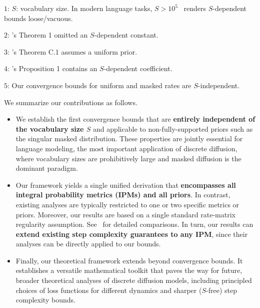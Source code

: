 \documentclass{article} %
\begin{document}
\begin{table}[ht]
\begin{tablenotes}
        \footnotesize
        \item[1] $1$: $S$: vocabulary size. In modern language tasks, $S > 10^5$~\citep{nie2026large} renders $S$-dependent bounds loose/vacuous.
        \item[2] $2$: \cite{liang2026absorb}'s Theorem 1 omitted an $S$-dependent constant.
        \item[3] $3$: \cite{ren2025discrete}'s Theorem C.1 assumes a uniform prior.
        \item[4] $4$: \cite{liang2026sharp}'s Proposition 1 contains an $S$-dependent coefficient.
        \item[5] $5$: Our convergence bounds for uniform and masked rates are $S$-independent.
    \end{tablenotes}
\end{table}

We summarize our contributions as follows.
\begin{itemize}
    \item We establish the first convergence bounds that are \textbf{entirely independent of the vocabulary size $S$} and applicable to non-fully-supported priors such as the singular masked distribution. These properties are jointly essential for language modeling, the most important application of discrete diffusion, where vocabulary sizes are prohibitively large and masked diffusion is the dominant paradigm.
    \item Our framework yields a single unified derivation that \textbf{encompasses all integral probability metrics (IPMs) and all priors}. In contrast, existing analyses are typically restricted to one or two specific metrics or priors. Moreover, our results are based on a single standard rate-matrix regularity assumption. See~ for detailed comparisons. In turn, our results can \textbf{extend existing step complexity guarantees to any IPM}, since their analyses can be directly applied to our bounds.
    \item Finally, our theoretical framework extends beyond convergence bounds. It establishes a versatile mathematical toolkit that paves the way for future, broader theoretical analyses of discrete diffusion models, including principled choices of loss functions for different dynamics and sharper ($S$-free) step complexity bounds.
\end{itemize}
\end{document}
